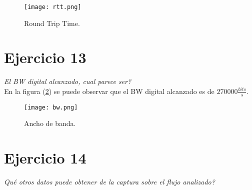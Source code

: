 \documentclass[osajnl,twocolumn,showpacs,superscriptaddress,10pt]{revtex4-1} %
\begin{document}
\begin{figure}[H]
    \centering
    \texttt{[image: rtt.png]}
    \caption{Round Trip Time.}
    \label{rtt}
\end{figure}

\section{Ejercicio 13}

\textit{El BW digital alcanzado, cual parece ser?} \\

En la figura (\ref{bw}) se puede observar que el BW digital alcanzado es de $270000 \frac{bits}{s}$.

\begin{figure}[H]
    \centering
    \texttt{[image: bw.png]}
    \caption{Ancho de banda.}
    \label{bw}
\end{figure}

\section{Ejercicio 14}

\textit{Qué otros datos puede obtener de la captura sobre el flujo analizado?}
\end{document}
